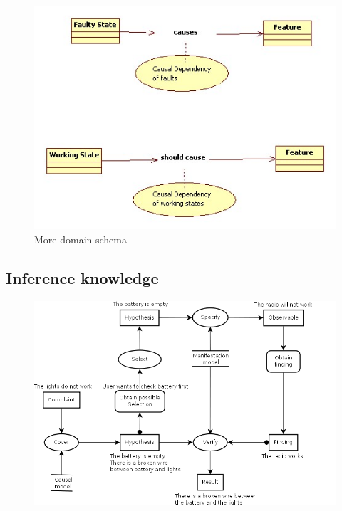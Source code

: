 \documentclass[a4paper,10pt]{article}
\begin{document}
\begin{figure}[htbp]
	\centering
		\includegraphics[width=1.00\textwidth]{ruleTypes.jpg}
	\caption{More domain schema}
	\label{fig:IS}
\end{figure}


\subsection{Inference knowledge}
\begin{figure}[htbp]
	\centering
		\includegraphics[width=1.00\textwidth]{InferenceModel.png}
	\label{fig:InferenceModel}
\end{figure}
\end{document}
